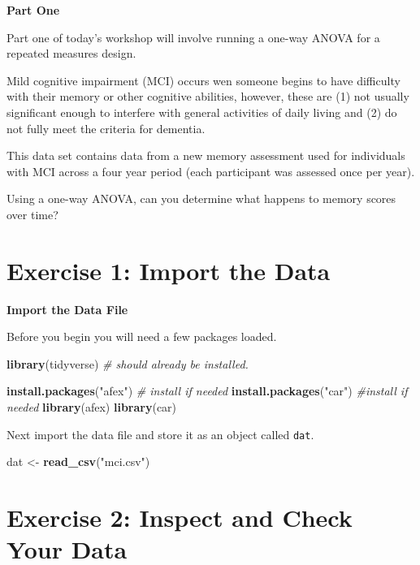 \documentclass[
]{book}
\newenvironment{Shaded}{\begin{snugshade}}{\end{snugshade}}
\newcommand{\CommentTok}[1]{\textcolor[rgb]{0.56,0.35,0.01}{\textit{#1}}}
\newcommand{\FunctionTok}[1]{\textcolor[rgb]{0.13,0.29,0.53}{\textbf{#1}}}
\newcommand{\NormalTok}[1]{#1}
\newcommand{\OtherTok}[1]{\textcolor[rgb]{0.56,0.35,0.01}{#1}}
\newcommand{\StringTok}[1]{\textcolor[rgb]{0.31,0.60,0.02}{#1}}
\let\oldsection\section
\renewcommand{\section}{\needspace{5\baselineskip}\oldsection}
\begin{document}
\textbf{Part One}

Part one of today's workshop will involve running a one-way ANOVA for a repeated measures design.

Mild cognitive impairment (MCI) occurs wen someone begins to have difficulty with their memory or other cognitive abilities, however, these are (1) not usually significant enough to interfere with general activities of daily living and (2) do not fully meet the criteria for dementia.

This data set contains data from a new memory assessment used for individuals with MCI across a four year period (each participant was assessed once per year).

Using a one-way ANOVA, can you determine what happens to memory scores over time?

\section{Exercise 1: Import the Data}\label{exercise-1-import-the-data-3}

\textbf{Import the Data File}

Before you begin you will need a few packages loaded.

\begin{Shaded}
\begin{Highlighting}[]
\FunctionTok{library}\NormalTok{(tidyverse) }\CommentTok{\# should already be installed.}

\FunctionTok{install.packages}\NormalTok{(}\StringTok{"afex"}\NormalTok{) }\CommentTok{\# install if needed}
\FunctionTok{install.packages}\NormalTok{(}\StringTok{"car"}\NormalTok{) }\CommentTok{\#install if needed}
\FunctionTok{library}\NormalTok{(afex)}
\FunctionTok{library}\NormalTok{(car)}
\end{Highlighting}
\end{Shaded}

Next import the data file and store it as an object called \texttt{dat}.

\begin{Shaded}
\begin{Highlighting}[]
\NormalTok{dat }\OtherTok{\textless{}{-}} \FunctionTok{read\_csv}\NormalTok{(}\StringTok{"mci.csv"}\NormalTok{)}
\end{Highlighting}
\end{Shaded}

\section{Exercise 2: Inspect and Check Your Data}\label{exercise-2-inspect-and-check-your-data-3}
\end{document}
